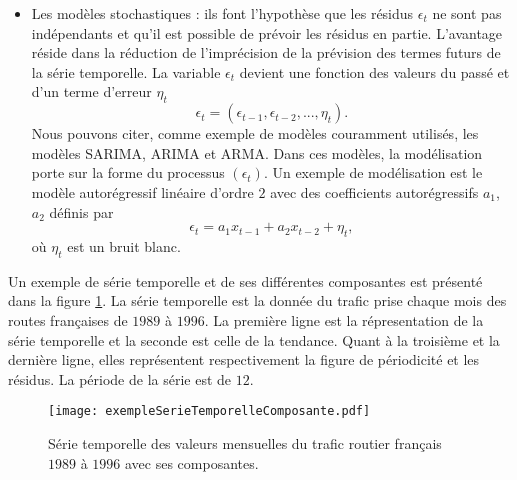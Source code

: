 \begin{itemize}
	\item Les mod\`eles stochastiques : ils font l'hypoth\`ese que les r\'esidus $\epsilon_t$ ne sont pas ind\'ependants et qu'il est possible de pr\'evoir les r\'esidus en partie. L'avantage r\'eside dans la r\'eduction de l'impr\'ecision de la pr\'evision des termes futurs de la s\'erie temporelle.  La variable $\epsilon_t$ devient une fonction des valeurs du pass\'e et d'un terme d'erreur $\eta_t$ $$\epsilon_t = (\epsilon_{t-1}, \epsilon_{t-2}, ... , \eta_{t}).$$
	Nous pouvons citer, comme exemple de mod\`eles couramment utilis\'es, les mod\`eles SARIMA, ARIMA et ARMA. Dans ces mod\`eles, la mod\'elisation porte sur la forme du processus $(\epsilon_t)$. Un exemple de mod\'elisation est le mod\`ele autor\'egressif lin\'eaire d'ordre $2$ avec des coefficients autor\'egressifs $a_1$, $a_2$ d\'efinis par 
	$$\epsilon_t = a_1 x_{t-1} + a_2 x_{t-2} + \eta_t,$$ o\`u $\eta_t$ est un bruit blanc.
\end{itemize}
Un exemple de s\'erie temporelle et de ses diff\'erentes composantes est pr\'esent\'e dans la figure \ref{exempleSerieTemporelleComposante}. La s\'erie temporelle est la donn\'ee du trafic prise chaque mois des routes fran\c caises de $1989$ \`a $1996$.
La premi\`ere ligne est la r\'epresentation de la s\'erie temporelle et la seconde est celle de la tendance. Quant \`a la troisi\`eme  et la derni\`ere ligne, elles repr\'esentent respectivement la figure de p\'eriodicit\'e et les r\'esidus. La p\'eriode de la s\'erie est de $12$.
\begin{figure}[htb!] 
\centering
\texttt{[image: exempleSerieTemporelleComposante.pdf]}
\caption{ S\'erie temporelle des valeurs mensuelles du trafic routier fran\c cais $1989$ \`a $1996$ avec ses composantes.}
\label{exempleSerieTemporelleComposante}
\end{figure}

